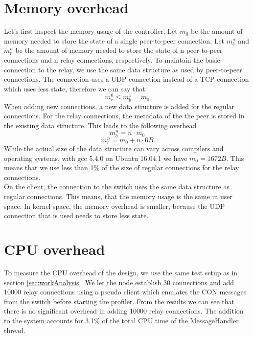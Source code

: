 \section{Memory overhead \label{evaluation:memory}}
Let's first inspect the memory usage of the controller.
Let $m_0$ be the amount of memory needed to store the state of a single peer-to-peer connection. Let $m_b^n$ and $m_r^n$ be the amount of memory needed to store the state of n peer-to-peer connections and n relay connections, respectively. To maintain the basic connection to the relay, we use the same data structure as used by peer-to-peer connections. The connection uses a UDP connection instead of a TCP connection which uses less state, therefore we can say that
\begin{equation}
	m_r^0 \leq m_b^1 = m_0
\end{equation}
When adding new connections, a new data structure is added for the regular connections. For the relay connections, the metadata of the the peer is stored in the existing data structure. This leads to the following overhead
\begin{equation}
	m_b^n = n\cdot m_0
\end{equation}
\begin{equation}
	m_r^n = m_0 + n\cdot 6B
\end{equation}
While the actual size of the data structure can vary across compilers and operating systems, with gcc 5.4.0 on Ubuntu 16.04.1 we have $m_0 = 1672B$. This means that we use less than 1\% of the size of regular connections for the relay connections.\\
On the client, the connection to the switch uses the same data structure as regular connections. This means, that the memory usage is the same in user space. In kernel space, the memory overhead is smaller, because the UDP connection that is used needs to store less state.









\section{CPU overhead\label{evaluation:cpu}}
To measure the CPU overhead of the design, we use the same test setup as in section \ref{sec:workAnalysis}. We let the node establish 30 connections and add 10000 relay connections using a pseudo client which emulates the CON messages from the switch before starting the profiler. From the results we can see that there is no significant overhead in adding 10000 relay connections. The addition to the system accounts for 3.1\% of the total CPU time of the MessageHandler thread.





